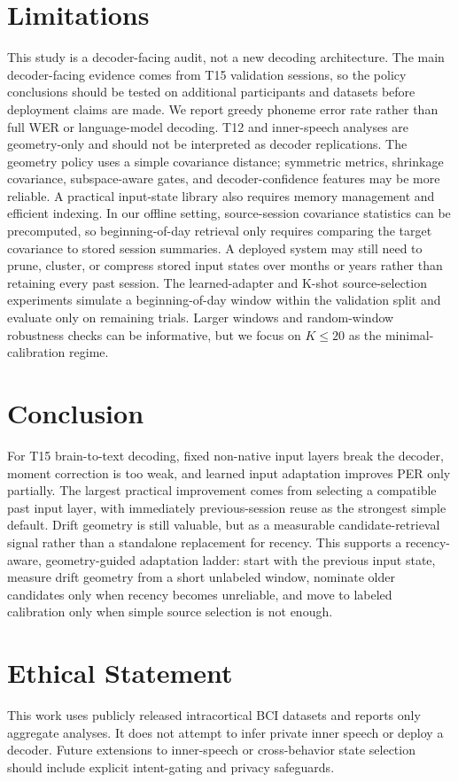 \documentclass{article}
\begin{document}
\section{Limitations}
This study is a decoder-facing audit, not a new decoding architecture. The main decoder-facing evidence comes from T15 validation sessions, so the policy conclusions should be tested on additional participants and datasets before deployment claims are made. We report greedy phoneme error rate rather than full WER or language-model decoding. T12 and inner-speech analyses are geometry-only and should not be interpreted as decoder replications. The geometry policy uses a simple covariance distance; symmetric metrics, shrinkage covariance, subspace-aware gates, and decoder-confidence features may be more reliable. A practical input-state library also requires memory management and efficient indexing. In our offline setting, source-session covariance statistics can be precomputed, so beginning-of-day retrieval only requires comparing the target covariance to stored session summaries. A deployed system may still need to prune, cluster, or compress stored input states over months or years rather than retaining every past session. The learned-adapter and K-shot source-selection experiments simulate a beginning-of-day window within the validation split and evaluate only on remaining trials. Larger windows and random-window robustness checks can be informative, but we focus on $K \leq 20$ as the minimal-calibration regime.

\section{Conclusion}
For T15 brain-to-text decoding, fixed non-native input layers break the decoder, moment correction is too weak, and learned input adaptation improves PER only partially. The largest practical improvement comes from selecting a compatible past input layer, with immediately previous-session reuse as the strongest simple default. Drift geometry is still valuable, but as a measurable candidate-retrieval signal rather than a standalone replacement for recency. This supports a recency-aware, geometry-guided adaptation ladder: start with the previous input state, measure drift geometry from a short unlabeled window, nominate older candidates only when recency becomes unreliable, and move to labeled calibration only when simple source selection is not enough.

\section*{Ethical Statement}
This work uses publicly released intracortical BCI datasets and reports only aggregate analyses. It does not attempt to infer private inner speech or deploy a decoder. Future extensions to inner-speech or cross-behavior state selection should include explicit intent-gating and privacy safeguards.


\clearpage


\end{document}
